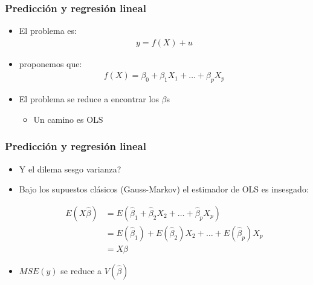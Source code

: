\documentclass[
  shownotes,
  xcolor={svgnames},
  hyperref={colorlinks,citecolor=DarkBlue,linkcolor=DarkRed,urlcolor=DarkBlue}
  , aspectratio=169]{beamer}
\begin{document}
\begin{frame}
\frametitle{Predicción y regresión lineal}

\begin{itemize}


\item El problema es:
\medskip
\begin{align}
y=f(X)+u
\end{align}

\item proponemos que:
\begin{align}
  f(X) = \beta_0 + \beta_1 X_1 + \dots + \beta_p X_p 
\end{align}

\item El problema se reduce a encontrar los $\beta$s
  \begin{itemize}
    \footnotesize
    \item Un camino es OLS
  \end{itemize}  
\end{itemize}
\end{frame}
\begin{frame}
\frametitle{Predicción y regresión lineal}

\begin{itemize}
  \item Y el dilema sesgo varianza?
  \pause
  \item Bajo los supuestos clásicos (Gauss-Markov) el estimador de OLS es insesgado:

\medskip
\begin{align}
  E( X \hat \beta)&= E(\hat{\beta}_1 + \hat{\beta}_2 X_2 + \dots + \hat{\beta}_p X_p) \\ 
  &= E(\hat{\beta}_1) + E(\hat{\beta}_2) X_2 + \dots + E(\hat{\beta}_p) X_p  \\ 
  &= X \beta
\end{align}
\medskip

\item  $MSE(\hat y)$ se reduce a  $V(\hat \beta)$

\end{itemize}

\end{frame}
\end{document}

